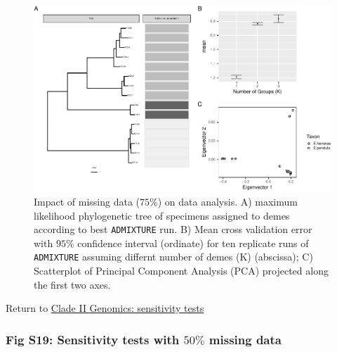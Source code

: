 \documentclass[
  11pt,
]{article}
\begin{document}
\begin{figure}
\includegraphics{Supplementary_Material_files/figure-latex/cladeIIgenomicSensitivityAnalysesLargestplots-1} \caption{Impact of missing data ($75\%$) on data analysis. A) maximum likelihood phylogenetic tree of specimens assigned to demes according to best \texttt{ADMIXTURE} run. B) Mean cross validation error with $95\%$ confidence interval (ordinate) for ten replicate runs of \texttt{ADMIXTURE} assuming differnt number of demes (K) (abscissa); C) Scatterplot of Principal Component Analysis (PCA) projected along the first two axes.}\label{fig:cladeIIgenomicSensitivityAnalysesLargestplots}
\end{figure}

Return to \protect\hyperlink{sensitivity-tests-1}{Clade II Genomics: sensitivity tests}
\pagebreak

\hypertarget{fig-s19-sensitivity-tests-with-50-missing-data}{%
\subsubsection{\texorpdfstring{Fig S19: Sensitivity tests with \(50\%\) missing data}{Fig S19: Sensitivity tests with 50\textbackslash\% missing data}}\label{fig-s19-sensitivity-tests-with-50-missing-data}}
\end{document}
